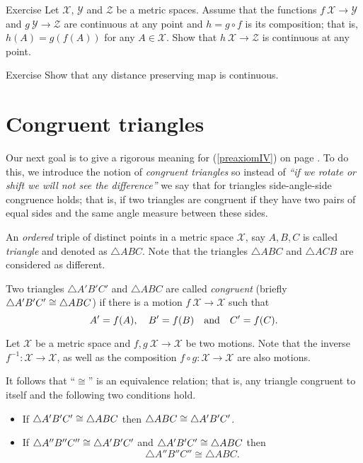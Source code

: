 \begin{thm}{Exercise}\label{ex:comp+cont}
Let $\mathcal{X}$, $\mathcal{Y}$ and $\mathcal{Z}$ be a metric spaces.
Assume that the functions $f\:\mathcal{X}\to\mathcal{Y}$
and $g\:\mathcal{Y}\to\mathcal{Z}$ are continuous at any point
and $h=g\circ f$ is its composition;
that is, $h(A)=g(f(A))$ for any $A\in \mathcal{X}$.
Show that $h\:\mathcal{X}\to\mathcal{Z}$ is continuous at any point.
\end{thm}

\begin{thm}{Exercise}\label{ex:isom-cont}
Show that any distance preserving map is continuous.
\end{thm}




\section*{Congruent triangles} 

Our next goal is to give a rigorous meaning for  (\ref{preaxiomIV}) on page \pageref{preaxiomIV}.
To do this, we introduce the notion of {}\emph{congruent triangles}
so instead of {}\emph{``if we rotate or shift we will not see the difference''} we say that for triangles side-angle-side congruence holds;
that is, if two triangles are congruent if they have two pairs of equal sides and the same angle measure between these sides.

An {}\emph{ordered} triple of distinct points in a metric space $\mathcal{X}$, 
say $A,B,C$
is called \emph{triangle}\label{page:def:triangle} and denoted as $\triangle A B C$.
Note that the triangles $\triangle A B C$ and $\triangle A C B$ are considered as different.

Two triangles $\triangle A' B' C'$ and $\triangle A B C$ are called 
\emph{congruent}
(briefly $\triangle A' B' C'\z\cong\triangle A B C$) if there is a motion $f\:\mathcal{X}\to\mathcal{X}$ such that 
\[A'\z=f(A),
\quad
B'=f(B)
\quad
\text{and}
\quad
C'=f(C).\]

Let $\mathcal X$ be a metric space
and $f,g\:\mathcal X\to\mathcal X$ be two motions.
Note that the inverse $f^{-1}:\mathcal X\to\mathcal X$,
as well as the composition $f\circ g:\mathcal X\to\mathcal X$
are also motions.

It follows that ``$\cong$'' is an equivalence relation;
that is, any triangle congruent to itself and the following two conditions hold.
\begin{itemize} 
\item If $\triangle A' B' C'\z\cong\triangle A B C$ then $\triangle A B C\z\cong\triangle A' B' C'$.
\item If $\triangle A'' B'' C''\z\cong\triangle A' B' C'$ and $\triangle A' B' C'\z\cong\triangle A B C$ 
then 
$$\triangle A'' B'' C''\cong\triangle A B C.$$
\end{itemize}


